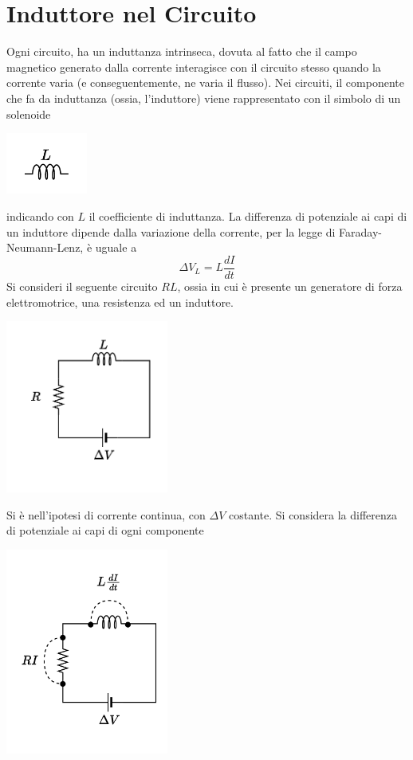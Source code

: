 \documentclass[10pt, letterpaper]{report}
\begin{document}
\section{Induttore nel Circuito}
Ogni circuito, ha un induttanza intrinseca, dovuta al fatto che il campo magnetico generato dalla corrente interagisce con il circuito stesso quando la corrente varia (e conseguentemente, ne varia il flusso). Nei circuiti, il componente che fa da induttanza (ossia, l'induttore) viene rappresentato con il simbolo di un solenoide\begin{center}
    \includegraphics[width=0.2\textwidth ]{images/induttanza.drawio.pdf}
\end{center}
indicando con $L$ il coefficiente di induttanza. La differenza di potenziale ai capi di un induttore dipende dalla variazione della corrente, per la legge di Faraday-Neumann-Lenz, è uguale a 
$$ \Delta V_L = L\dfrac{dI}{dt}$$
Si consideri il seguente circuito $RL$, ossia in cui è presente un generatore di forza elettromotrice, una resistenza ed un induttore.\begin{center}
    \includegraphics[width=0.4\textwidth ]{images/induttanza2.drawio.pdf}
\end{center}
Si è nell'ipotesi di corrente continua, con $\Delta V$ costante.
Si considera la differenza di potenziale ai capi di ogni componente \begin{center}
    \includegraphics[width=0.4\textwidth ]{images/induttanza3.drawio.pdf}
\end{center}
\end{document}
